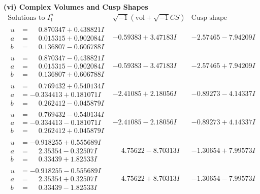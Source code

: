 \documentclass[1p]{elsarticle_modified}
\theoremstyle{definition}
\newcommand{\I}{\sqrt{-1}}
\begin{document}
\newpage\flushleft \textbf{(vi) Complex Volumes and Cusp Shapes}
$$\begin{array}{c|c|c}  
\text{Solutions to }I^u_{1}& \I (\text{vol} + \sqrt{-1}CS) & \text{Cusp shape}\\
 \hline 
\begin{aligned}
u &= \phantom{-}0.870347 + 0.438821 I \\
a &= \phantom{-}0.015315 + 0.902084 I \\
b &= \phantom{-}0.136807 - 0.606788 I\end{aligned}
 & -0.59383 + 3.47183 I & -2.57465 - 7.94209 I \\ \hline\begin{aligned}
u &= \phantom{-}0.870347 - 0.438821 I \\
a &= \phantom{-}0.015315 - 0.902084 I \\
b &= \phantom{-}0.136807 + 0.606788 I\end{aligned}
 & -0.59383 - 3.47183 I & -2.57465 + 7.94209 I \\ \hline\begin{aligned}
u &= \phantom{-}0.769432 + 0.540134 I \\
a &= -0.334413 + 0.181071 I \\
b &= \phantom{-}0.262412 - 0.045879 I\end{aligned}
 & -2.41085 + 2.18056 I & -0.89273 - 4.14337 I \\ \hline\begin{aligned}
u &= \phantom{-}0.769432 - 0.540134 I \\
a &= -0.334413 - 0.181071 I \\
b &= \phantom{-}0.262412 + 0.045879 I\end{aligned}
 & -2.41085 - 2.18056 I & -0.89273 + 4.14337 I \\ \hline\begin{aligned}
u &= -0.918255 + 0.555689 I \\
a &= \phantom{-}2.35354 - 0.32507 I \\
b &= \phantom{-}0.33439 + 1.82533 I\end{aligned}
 & \phantom{-}4.75622 - 8.70313 I & -1.30654 + 7.99573 I \\ \hline\begin{aligned}
u &= -0.918255 - 0.555689 I \\
a &= \phantom{-}2.35354 + 0.32507 I \\
b &= \phantom{-}0.33439 - 1.82533 I\end{aligned}
 & \phantom{-}4.75622 + 8.70313 I & -1.30654 - 7.99573 I \\ \hline\begin{aligned}

\end{aligned}
\end{array}$$
\end{document}
